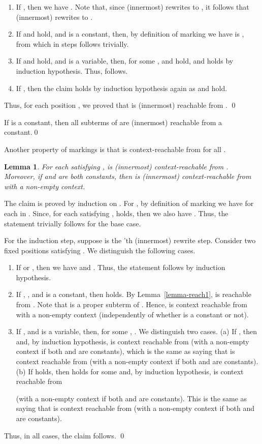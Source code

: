\documentclass{LMCS}
\theoremstyle{plain}
\newtheorem{lemma}[thm]{Lemma}
\begin{document}
\begin{enumerate}[]
\item If , then we have
. 
Note that, since  (innermost) rewrites to , it follows that
 (innermost) rewrites to .

\item If  and  hold, and  is a constant, then,
by definition of marking we have  is ,
from which 
in  steps follows trivially.

\item If  and  hold,
and  is a variable,
then, for some ,
 and
 hold, and
 holds
by induction hypothesis. Thus,
 follows.

\item If , then the claim holds by induction
hypothesis again as
 and  hold.
\end{enumerate}
Thus, for each position , we proved that
 is (innermost) reachable from  .
\qed


\begin{cor}\label{corollary-reach1}
If  is a constant, then all subterms of 
are (innermost) reachable from a constant.\qed
\end{cor}

Another property of markings is that 
 is context-reachable from  
for all .
\begin{lemma}\label{lemma-creach1}
For each  satisfying ,
 is (innermost) context-reachable from .
Moreover, if 
 and  are both constants,
then  is (innermost) context-reachable from 
with a non-empty context.
\end{lemma}
\proof
The claim is proved by induction on .
For , by definition of marking we have  for
each  in . Since, for each
 satisfying , 
 holds, then we also have
. Thus, the statement
trivially follows for the base case.

For the induction step,
suppose  is
the 'th (innermost) rewrite step. Consider two fixed positions
 satisfying .
We distinguish the following cases.
\begin{enumerate}[]
\item If  or , then we have
 and .
Thus, the statement follows by induction hypothesis.

\item If , , and  is a constant, then
 holds.
By Lemma~\ref{lemma-reach1},
 is reachable from .
Note that  is a proper subterm of .
Hence,
 is context reachable from 
with a non-empty context (independently of whether
 is a constant or not).

\item If ,  and  is a variable,
then, for some , .
We distinguish two cases. 
(a) If , then 
  and, by induction hypothesis,
 is context reachable from 
(with a non-empty context if both  and
 are constants),
which is the same as saying that
 is context reachable from 
(with a non-empty context if both  and
 are constants).
(b) If  holds, then
 holds for some 
and, by induction hypothesis,
 is context reachable from

(with a non-empty context if both  and
 are constants).
This is the same as saying that
 is context reachable from 
(with a non-empty context if both  and
 are constants).
\end{enumerate}
Thus, in all cases, the claim follows. \qed
\end{document}
